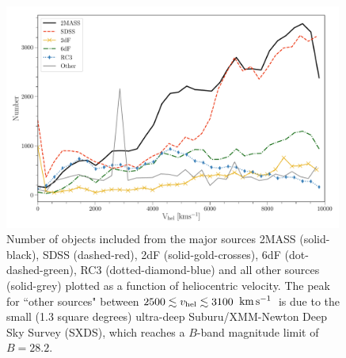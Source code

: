 \documentclass[twocolumn,tighten]{aastex62}
\newcommand{\kms}{$\rm km\, s^{-1}$}
\begin{document}
\begin{figure}[ht!]
        \centering
        \vspace{0pt}
        \includegraphics[width=0.99\textwidth]{hist_by_survey8_filtered_0only.pdf}
        \caption{\small{Number of objects included from the major sources 2MASS (solid-black), SDSS (dashed-red), 2dF (solid-gold-crosses), 6dF (dot-dashed-green), RC3 (dotted-diamond-blue) and all other sources (solid-grey) plotted as a function of heliocentric velocity. The peak for ``other sources" between $2500 \lesssim v_{\rm hel} \lesssim 3100$ \kms~is due to the small (1.3 square degrees) ultra-deep Suburu/XMM-Newton Deep Sky Survey (SXDS), which reaches a $B$-band magnitude limit of $B=28.2$.}}
        \vspace{5pt}
        \label{source_histograms}
\end{figure} 
\end{document}
